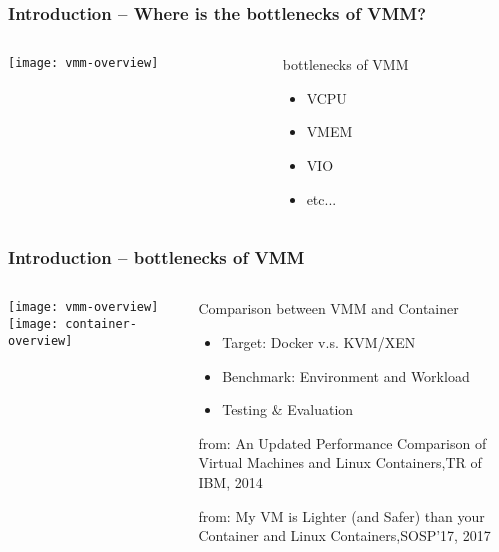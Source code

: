 \begin{frame}[plain]
	\frametitle{Introduction -- Where is the bottlenecks of VMM?}



	\begin{columns}

	\begin{column}{.4\textwidth}
	
	\texttt{[image: vmm-overview]}
	
	\end{column}

	\begin{column}{.6\textwidth}
	
	\Large
    bottlenecks of VMM	
	\begin{itemize}
	\item VCPU
	\item VMEM
	\item VIO
	\item  etc...
	\end{itemize}	


	\end{column}
	
    
\end{columns}


\end{frame}


\begin{frame}[plain]
	\frametitle{Introduction -- bottlenecks of VMM}
	
	
	
	\begin{columns}
		
		\begin{column}{.4\textwidth}
			\centering
			\texttt{[image: vmm-overview]}
			\texttt{[image: container-overview]}
		\end{column}
		
		\begin{column}{.6\textwidth}
			
			\Large
			Comparison between VMM and Container
			\begin{itemize}
				\item Target: Docker v.s. KVM/XEN 
				\item Benchmark: Environment and Workload
				\item Testing \& Evaluation

			\end{itemize}	
			
			\tiny from: An Updated Performance Comparison of Virtual Machines	and Linux Containers,TR of IBM, 2014
			
			\tiny from: My VM is Lighter (and Safer) than your Container and Linux Containers,SOSP'17, 2017
		\end{column}
		
		
	\end{columns}
	
	
\end{frame}


